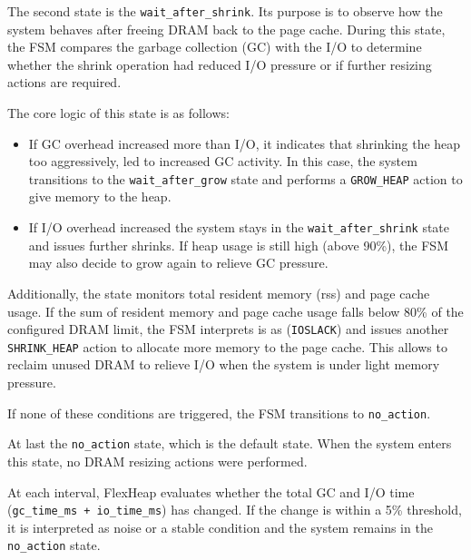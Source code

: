 The second state is the \texttt{wait\_after\_shrink}. Its purpose is to 
observe how the system behaves after freeing DRAM back to the page cache. During this
state, the FSM compares the garbage collection (GC) with the I/O to determine whether
the shrink operation had reduced I/O pressure or if further resizing actions are required.

The core logic of this state is as follows:
\begin{itemize}
  
  \item 
  If GC overhead increased more than I/O, it indicates that shrinking the heap too aggressively,
  led to increased GC activity. In this case, the system transitions to the \texttt{wait\_after\_grow} state
  and performs a \texttt{GROW\_HEAP} action to give memory to the heap.
  
  \item If I/O overhead increased  the system stays in the \texttt{wait\_after\_shrink} state and issues further shrinks.
  If heap usage is still high (above 90\%), the FSM may also decide to grow again to relieve GC pressure.
\end{itemize}

Additionally, the state monitors total resident memory (rss) and page cache usage.
If the sum of resident memory and page cache usage falls below 80\% 
of the configured DRAM limit, the FSM interprets is as (\texttt{IOSLACK}) and 
issues another \texttt{SHRINK\_HEAP} action to allocate more memory to the page cache. This allows 
to reclaim unused DRAM to relieve I/O when the system is under light memory pressure.

If none of these conditions are triggered, the FSM 
transitions to \texttt{no\_action}.

At last the \texttt{no\_action} state, which is the default state.
When the system enters this state, no DRAM resizing actions were performed.

At each interval, FlexHeap evaluates whether the total GC and I/O time (\texttt{gc\_time\_ms + io\_time\_ms}) has
changed. If the change is within a 5\% threshold, it is interpreted 
as noise or a stable condition and the system remains in the \texttt{no\_action} state.

